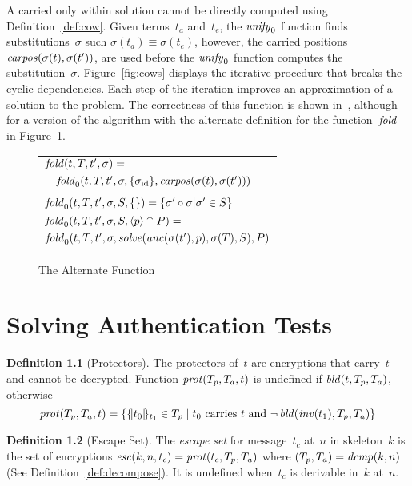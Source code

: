 \documentclass[12pt]{report}
\theoremstyle{definition}
\newtheorem{defn}{Definition}[chapter]
\begin{document}
A carried only within solution cannot be directly computed using
Definition~\ref{def:cow}.  Given terms~$t_a$ and~$t_e$, the
$\operatorname{\mathit{unify}}_0$ function finds substitutions~$\sigma$ such
$\sigma(t_a)\equiv \sigma(t_e)$, however, the carried positions
$\operatorname{\mathit{carpos}}(\sigma(t),\sigma(t'))$, are used before the
$\operatorname{\mathit{unify}}_0$ function computes the substitution~$\sigma$.
Figure~\ref{fig:cows} displays the iterative procedure that breaks the
cyclic dependencies.  Each step of the iteration improves an
approximation of a solution to the problem.  The correctness of this
function is shown in~\cite{algimpl11}, although for a version of the
algorithm with the alternate definition for the function~$\operatorname{\mathit{fold}}$ in
Figure~\ref{fig:fold}.

\begin{figure}
\begin{center}
\begin{tabular}{l}
$\operatorname{\mathit{fold}}(t,T,t',\sigma)={}$\\
$\quad\operatorname{\mathit{fold}}_0(t,T,t',\sigma,\{\sigma_{\mathrm{id}}\},\operatorname{\mathit{carpos}}(\sigma(t), \sigma(t')))$\\
\\
$\operatorname{\mathit{fold}}_0(t,T,t',\sigma,S,\{\})=\{\sigma' \circ \sigma | \sigma' \in S\}$\\
$\operatorname{\mathit{fold}}_0(t,T,t',\sigma,S,\langle p\rangle \mathbin{{}^\smallfrown} P)={}$\\
\quad
$\operatorname{\mathit{fold}}_0(t,T,t',\sigma,\operatorname{\mathit{solve}}(\operatorname{\mathit{anc}}(\sigma(t'),p),\sigma(T),S),P)$\\
\end{tabular}
\end{center}
\caption{The Alternate  Function}\label{fig:fold}
\end{figure}

\chapter{Solving Authentication Tests}\label{chp:auth tests}

\begin{defn}[Protectors]
The protectors of~$t$ are encryptions that carry~$t$
and cannot be decrypted.  Function $\operatorname{\mathit{prot}}(T_p,T_a,t)$ is undefined
if $\operatorname{\mathit{bld}}(t,T_p,T_a)$, otherwise
\[\operatorname{\mathit{prot}}(T_p,T_a,t)=\{\{\!|t_0|\!\}_{t_1}\in T_p\mid
\mbox{$t_0$ carries $t$ and }\lnot\operatorname{\mathit{bld}}(\operatorname{\mathit{inv}}(t_1),T_p,T_a)\}\]
\end{defn}

\begin{defn}[Escape Set]
The \emph{escape set} for message~$t_c$ at~$n$ in
skeleton~$k$ is the set of encryptions
$\operatorname{\mathit{esc}}(k,n,t_c)=\operatorname{\mathit{prot}}(t_c,T_p,T_a)$ where
$(T_p,T_a)=\operatorname{\mathit{dcmp}}(k,n)$ (See Definition~\ref{def:decompose}).  It
is undefined when~$t_c$ is derivable in~$k$ at~$n$.
\end{defn}
\end{document}
